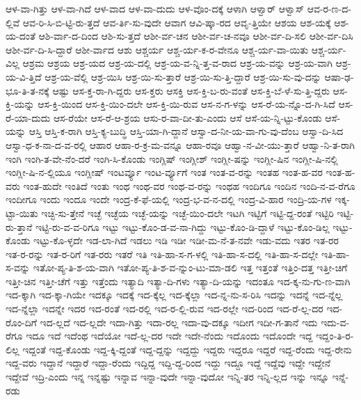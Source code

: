 {ಆಳ-ವಾ-ಗಿತ್ತು
ಆಳ-ವಾ-ಗಿದೆ
ಆಳ-ವಾದ
ಆಳ-ವಾ-ದುದು
ಆಳ-ವೊಂ-ದಕ್ಕೆ
ಆಳಾಗಿ
ಆಳ್ವಾರ್
ಆಳ್ವಾಸ್
ಆವ-ರ-ಣ-ದ-ಲ್ಲಿವೆ
ಆವ-ರಿ-ಸಿ-ಬಿ-ಟ್ಟಿ-ರು-ತ್ತದೆ
ಆವ-ರ್ತಿ-ಸು-ವುದೇ
ಆವಾಗ
ಆವಿ-ಷ್ಕಾ-ರದ
ಆವೃ-ತ್ತಿಯೇ
ಆಶಯ
ಆಶ-ಯಕ್ಕೆ
ಆಶ-ಯ-ದಂತೆ
ಆಶಿ-ರ್ವಾ-ದ-ದಿಂದ
ಆಶಿ-ಸು-ತ್ತದೆ
ಆಶೀ-ರ್ವ-ಚನ
ಆಶೀ-ರ್ವ-ಚ-ನವೂ
ಆಶೀ-ರ್ವ-ದಿ-ಸಲಿ
ಆಶೀ-ರ್ವ-ದಿಸಿ
ಆಶೀ-ರ್ವ-ದಿ-ಸಿ-ದ್ದಾರೆ
ಆಶೀ-ರ್ವಾದ
ಆಶು
ಆಶ್ಚರ್ಯ
ಆಶ್ಚ-ರ್ಯ-ಕ-ರ-ವೇನೂ
ಆಶ್ಚ-ರ್ಯ-ವಾ-ಯಿತು
ಆಶ್ಚ-ರ್ಯ-ವಿಲ್ಲ
ಆಶ್ರಮ
ಆಶ್ರಯ
ಆಶ್ರ-ಯದ
ಆಶ್ರ-ಯ-ದಲ್ಲಿ
ಆಶ್ರ-ಯ-ವ-ನ್ನಿ-ತ್ತ-ವ-ರಾದ
ಆಶ್ರ-ಯ-ವನ್ನು
ಆಶ್ರ-ಯ-ವಾಗಿ
ಆಶ್ರ-ಯ-ವಿ-ತ್ತಿದೆ
ಆಶ್ರ-ಯ-ವೆಲ್ಲಿ
ಆಶ್ರ-ಯಿಸಿ
ಆಶ್ರ-ಯಿ-ಸು-ತ್ತಾರೆ
ಆಶ್ರ-ಯಿ-ಸು-ತ್ತಿ-ದ್ದಾರೆ
ಆಶ್ರ-ಯಿ-ಸು-ವು-ದನ್ನು
ಆಷಾ-ಢ-ಭೂ-ತಿ-ತ-ನಕ್ಕೆ
ಆಷ್ಟು
ಆಸ-ಕ್ತ-ರಾ-ಗಿ-ದ್ದರು
ಆಸ-ಕ್ತರು
ಆಸಕ್ತಿ
ಆಸ-ಕ್ತಿ-ಬ-ರು-ವಂತೆ
ಆಸ-ಕ್ತಿ-ಬೆ-ಳೆ-ಸು-ತ್ತಿ-ದ್ದರು
ಆಸ-ಕ್ತಿ-ಯನ್ನು
ಆಸ-ಕ್ತಿ-ಯಿಂದ
ಆಸ-ಕ್ತಿ-ಯಿಂ-ದಲೇ
ಆಸ-ಕ್ತಿ-ಯಿ-ರುವ
ಆಸ-ನ-ಗ-ಳನ್ನು
ಆಸ-ರೆ-ಯ-ನ್ನೊ-ದ-ಗಿ-ಸಿದೆ
ಆಸ-ರೆ-ಯಾ-ದುದು
ಆಸ-ರೆಯೇ
ಆಸ-ರೆ-ಆ-ಶ್ರಯ
ಆಸು-ರ-ವಾ-ದೀ-ತು-ಎಂದು
ಆಸೆ
ಆಸೆ-ಯ-ನ್ನಿ-ಟ್ಟು-ಕೊಂಡು
ಆಸೆ-ಯನ್ನು
ಆಸ್ತಿ
ಆಸ್ತಿ-ಕ-ರಾಗಿ
ಆಸ್ತಿ-ಕ್ಯ-ಬುದ್ಧಿ
ಆಸ್ತಿ-ಯಾ-ಗಿ-ದ್ದಾನೆ
ಆಸ್ವಾ-ದ-ನೀ-ಯ-ವಾ-ಗು-ವು-ದೆಂಬ
ಆಸ್ವಾ-ದಿ-ಸಿದ
ಆಸ್ವಾ-ಧ-ಕ-ನಾ-ದ-ವ-ರಲ್ಲಿ
ಆಹಾರ
ಆಹಾ-ರ-ಕ್ರ-ಮ-ವನ್ನೂ
ಆಹಾ-ರವೂ
ಆಹ್ವಾ-ನ-ವೀ-ಯು-ತ್ತಾರೆ
ಆಹ್ವಾ-ನಿ-ತ-ರಾಗಿ
ಇಂಗಿ
ಇಂಗಿ-ತ-ವೇ-ನೆಂ-ದರೆ
ಇಂಗಿ-ಸಿ-ಕೊಂಡು
ಇಂಗ್ಲಿಷ್
ಇಂಗ್ಲೀಶ್
ಇಂಗ್ಲೀ-ಷನ್ನು
ಇಂಗ್ಲೀ-ಷಿನ
ಇಂಗ್ಲೀ-ಷಿ-ನಲ್ಲಿ
ಇಂಗ್ಲೀ-ಷಿ-ನ-ಲ್ಲಿಯೂ
ಇಂಗ್ಲೀಷ್
ಇಂಟರ್ವ್ಯೂ
ಇಂಟ-ರ್ವ್ಯೂಗೆ
ಇಂತ
ಇಂತ-ವ-ರನ್ನು
ಇಂತಹ
ಇಂತ-ಹ-ವರ
ಇಂತ-ಹ-ವರು
ಇಂತ-ಹುದೇ
ಇಂತಿದೆ
ಇಂತು
ಇಂಥ
ಇಂಥ-ವರ
ಇಂಥ-ವ-ರನ್ನು
ಇಂಥಹ
ಇಂದಿಗೂ
ಇಂದಿನ
ಇಂದಿ-ನ-ವ-ರೆಗೂ
ಇಂದೀಗೂ
ಇಂದು
ಇಂದೂ
ಇಂದೇ
ಇಂದ್ರ-ಕೆ-ಫೆ-ಯಲ್ಲಿ
ಇಂದ್ರ-ಭ-ವ-ನ-ದಲ್ಲಿ
ಇಂದ್ರ-ವಿ-ಹಾರ
ಇಂದ್ರಿ-ಯ-ಗಳ
ಇಕ್ಕ-ಟ್ಟಾ-ಯಿತು
ಇಚ್ಛಿ-ಸು-ತ್ತೇನೆ
ಇಚ್ಛೆ
ಇಚ್ಛೆಯ
ಇಚ್ಛೆ-ಯನ್ನು
ಇಚ್ಛೆ-ಯಿಂ-ದಲೇ
ಇಟಗಿ
ಇಟ್ಟಿಗೆ
ಇಟ್ಟಿ-ದ್ದ-ರಂತೆ
ಇಟ್ಟಿರಿ
ಇಟ್ಟಿ-ರು-ತ್ತಾನೆ
ಇಟ್ಟಿ-ರು-ವ-ವ-ರಿಗೂ
ಇಟ್ಟು
ಇಟ್ಟು-ಕೊಂ-ಡ-ವ-ನಾ-ಗಿದ್ದು
ಇಟ್ಟು-ಕೊಂ-ಡಿ-ದ್ದಾಳೆ
ಇಟ್ಟು-ಕೊಂ-ಡಿಲ್ಲ
ಇಟ್ಟು-ಕೊಂಡು
ಇಟ್ಟು-ಕೊ-ಳ್ಳದೇ
ಇಡ-ಲಾ-ಗಿದೆ
ಇಡಲು
ಇಡಿ
ಇಡೀ
ಇಡೀ-ಮ-ನೆ-ತ-ನವೇ
ಇಡು-ವದು
ಇತರ
ಇತ-ರರ
ಇತ-ರ-ರನ್ನು
ಇತ-ರ-ರಿಗೆ
ಇತ-ರರು
ಇತರೆ
ಇತಿ
ಇತಿ-ಹಾ-ಸ-ಗ-ಳಲ್ಲಿ
ಇತಿ-ಹಾ-ಸ-ದಲ್ಲಿ
ಇತಿ-ಹಾ-ಸ-ದಲ್ಲೇ
ಇತಿ-ಹಾ-ಸ-ವನ್ನು
ಇತೋ-ಪ್ಯ-ತಿ-ಶ-ಯ-ವಾಗಿ
ಇತೋ-ಪ್ಯ-ತಿ-ಶ-ವ-ನ್ನುಂ-ಟು-ಮಾ-ಡಲಿ
ಇತ್ತ
ಇತ್ತಂತೆ
ಇತ್ತಿಂ-ದತ್ತ
ಇತ್ತೀ-ಚಿಗೆ
ಇತ್ತೀ-ಚಿನ
ಇತ್ತೀ-ಚೆಗೆ
ಇತ್ತು
ಇತ್ತೆಂದು
ಇತ್ಯಾದಿ
ಇತ್ಯಾ-ದಿ-ಗಳು
ಇತ್ಯಾ-ದಿ-ಯನ್ನು
ಇದಂತೂ
ಇದ-ಕ್ಕ-ನು-ಗು-ಣ-ವಾಗಿ
ಇದ-ಕ್ಕಾಗಿ
ಇದ-ಕ್ಕಾ-ಗಿಯೇ
ಇದಕ್ಕೂ
ಇದಕ್ಕೆ
ಇದ-ಕ್ಕೆಲ್ಲ
ಇದ-ಕ್ಕೆಲ್ಲಾ
ಇದ-ನ್ನ-ನು-ಸ-ರಿಸಿ
ಇದನ್ನು
ಇದನ್ನೆ
ಇದ-ನ್ನೆಲ್ಲ
ಇದ-ನ್ನೆಲ್ಲಾ
ಇದನ್ನೇ
ಇದರ
ಇದ-ರಂತೆ
ಇದ-ರಲ್ಲಿ
ಇದ-ರ-ಲ್ಲಿ-ರುವ
ಇದ-ರಲ್ಲೇ
ಇದ-ರಿಂದ
ಇದ-ರೆ-ಲ್ಲ-ದರ
ಇದ-ರೊಂ-ದಿಗೆ
ಇದ-ಲ್ಲದೆ
ಇದ-ಲ್ಲದೇ
ಇದಾ-ಗಿತ್ತು
ಇದಾ-ರಲ್ಲ
ಇದಾ-ವು-ದಕ್ಕೂ
ಇದೀಗ
ಇದೀ-ಗ-ತಾನೆ
ಇದು
ಇದು-ವ-ರೆಗೂ
ಇದೂ
ಇದೆ
ಇದೆಂಥ
ಇದೆಯೋ
ಇದೆ-ಲ್ಲ-ದರ
ಇದೇ
ಇದೇ-ನೆಂದು
ಇದೊಂದು
ಇದೊಂದೇ
ಇದ್ದ
ಇದ್ದಂ-ತಿ-ರ-ಲಿಲ್ಲ
ಇದ್ದಂತೆ
ಇದ್ದ-ಕೊಂಡು
ಇದ್ದ-ಕ್ಕಿ-ದ್ದಂತೆ
ಇದ್ದ-ದ್ದನ್ನು
ಇದ್ದದ್ದು
ಇದ್ದರು
ಇದ್ದರೂ
ಇದ್ದರೆ
ಇದ್ದ-ರೆಂದು
ಇದ್ದ-ರೇನು
ಇದ್ದ-ವರು
ಇದ್ದಾನೆ
ಇದ್ದಾರೆ
ಇದ್ದಾ-ರೆಂದು
ಇದ್ದಿದ್ದ
ಇದ್ದಿ-ದ್ದ-ರಿಂದ
ಇದ್ದು
ಇದ್ದೂ
ಇದ್ದೆ
ಇದ್ದೆವು
ಇದ್ದೇ
ಇದ್ದೇನೆ
ಇದ್ದೇವೆ
ಇದ್ರಿ-ಎಂದು
ಇನ್ನ
ಇನ್ನಷ್ಟು
ಇನ್ನಾವ
ಇನ್ನಾ-ವುದೇ
ಇನ್ನಾ-ವುದೋ
ಇನ್ನಿ-ತರ
ಇನ್ನಿ-ಲ್ಲದ
ಇನ್ನು
ಇನ್ನೂ
ಇನ್ನೆ-ರಡು
}
